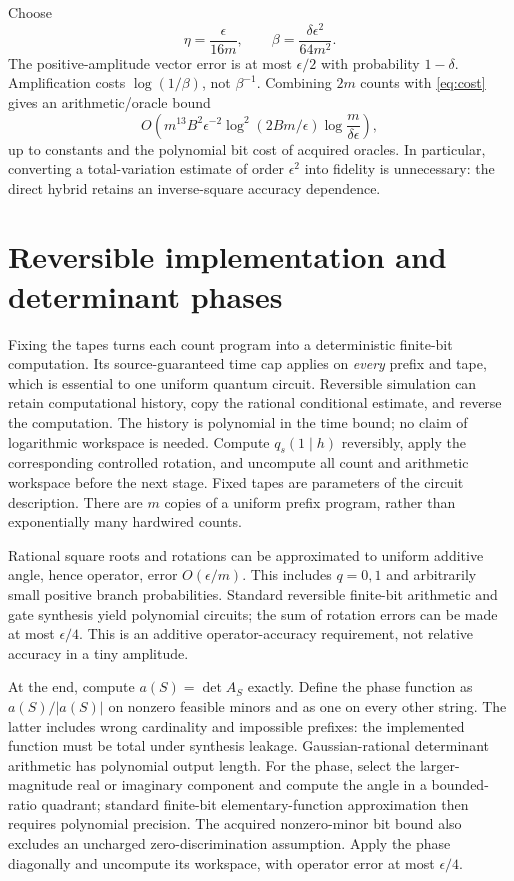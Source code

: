 \documentclass[11pt]{article}
\theoremstyle{remark}
\begin{document}
Choose
\begin{equation}\label{eq:parameters}
 \eta=\frac{\epsilon}{16m},\qquad
 \beta=\frac{\delta\epsilon^2}{64m^2}.
\end{equation}
The positive-amplitude vector error is at most $\epsilon/2$ with probability $1-\delta$. Amplification costs $\log(1/\beta)$, not $\beta^{-1}$. Combining $2m$ counts with \eqref{eq:cost} gives an arithmetic/oracle bound
\[
 O\!\left(m^{13}B^2\epsilon^{-2}
 \log^2(2Bm/\epsilon)\log\frac{m}{\delta\epsilon}\right),
\]
up to constants and the polynomial bit cost of acquired oracles. In particular, converting a total-variation estimate of order $\epsilon^2$ into fidelity is unnecessary: the direct hybrid retains an inverse-square accuracy dependence.

\section{Reversible implementation and determinant phases}
Fixing the tapes turns each count program into a deterministic finite-bit computation. Its source-guaranteed time cap applies on \emph{every} prefix and tape, which is essential to one uniform quantum circuit. Reversible simulation can retain computational history, copy the rational conditional estimate, and reverse the computation. The history is polynomial in the time bound; no claim of logarithmic workspace is needed. Compute $q_s(1\mid h)$ reversibly, apply the corresponding controlled rotation, and uncompute all count and arithmetic workspace before the next stage. Fixed tapes are parameters of the circuit description. There are $m$ copies of a uniform prefix program, rather than exponentially many hardwired counts.

Rational square roots and rotations can be approximated to uniform additive angle, hence operator, error $O(\epsilon/m)$. This includes $q=0,1$ and arbitrarily small positive branch probabilities. Standard reversible finite-bit arithmetic and gate synthesis yield polynomial circuits; the sum of rotation errors can be made at most $\epsilon/4$. This is an additive operator-accuracy requirement, not relative accuracy in a tiny amplitude.

At the end, compute $a(S)=\det A_S$ exactly. Define the phase function as $a(S)/|a(S)|$ on nonzero feasible minors and as one on every other string. The latter includes wrong cardinality and impossible prefixes: the implemented function must be total under synthesis leakage. Gaussian-rational determinant arithmetic has polynomial output length. For the phase, select the larger-magnitude real or imaginary component and compute the angle in a bounded-ratio quadrant; standard finite-bit elementary-function approximation then requires polynomial precision. The acquired nonzero-minor bit bound also excludes an uncharged zero-discrimination assumption. Apply the phase diagonally and uncompute its workspace, with operator error at most $\epsilon/4$.
\end{document}
